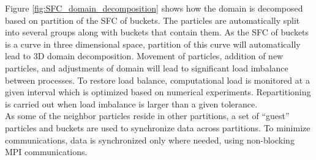 \documentclass[procedia]{easychair}
\begin{document}
Figure \ref{fig:SFC_domain_decomposition} shows how the domain is decomposed based on partition of the SFC of buckets. The particles are automatically split into several groups along with buckets that contain them. As the SFC of buckets is a curve in three dimensional space, partition of this curve will automatically lead to 3D domain decomposition. 
Movement of particles, addition of new particles, and adjustments of domain will lead to significant load imbalance between processes. To restore load balance, computational load is monitored at a given interval which is optimized based on numerical experiments. Repartitioning is carried out when load imbalance is larger than a given tolerance.
\\
As some of the neighbor particles reside in other partitions, a set of ``guest'' particles and buckets are used to synchronize data across partitions. To minimize communications, data is synchronized only where needed, using non-blocking MPI communications. 
\end{document}
